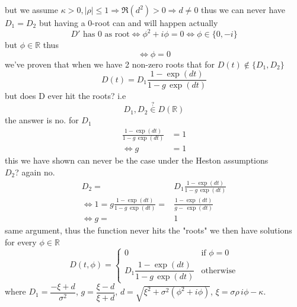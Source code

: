 but we assume  $\kappa>0,|\rho|\leq 1 \Rightarrow \Re (d^2)>0\Rightarrow d\neq 0$
thus we can never have $D_1=D_2$ but having a 0-root can and will happen actually
\begin{equation}D' \text{ has 0 as root}\Leftrightarrow \phi^2+i\phi=0\Leftrightarrow \phi\in \{0,-i\}\end{equation}
but $\phi\in \mathbb{R}$ thus
\begin{equation}\Leftrightarrow \phi=0\end{equation}
we've proven that when we have 2 non-zero roots that for  $D(t)\notin \{D_1,D_2\}$
\begin{equation}D(t)=D_1 \frac{1-\exp(dt)}{1-g\, \exp(dt)}\end{equation}
but does D ever hit the roots? i.e
\begin{equation}D_1,D_2\overset{?}{\in}D(\mathbb{R})\end{equation}
the answer is no. for $D_1$
\begin{align}
\frac{1-\exp(dt)}{1-g\, \exp(dt)}&= 1\\
\Leftrightarrow g&=1
\end{align}
this we have shown can never be the case under the Heston assumptions\\
$D_2$?
again no.
\begin{align}
D_2=&D_1 \frac{1-\exp(dt)}{1-g\, \exp(dt)}\\
\Leftrightarrow 1=g\frac{1-\exp(dt)}{1-g\, \exp(dt)}=&\frac{1-\exp(dt)}{g-\, \exp(dt)}\\
\Leftrightarrow g=&1
\end{align}
same argument, thus the function never hits the "roots"
we then have solutions for every $\phi\in\mathbb{R}$
\begin{equation}
D(t,\phi) =
\begin{cases}
0 & \text{if } \phi = 0 \\[4pt]
D_1 \dfrac{1-\exp(dt)}{1-g\,\exp(dt)} & \text{otherwise}
\end{cases}
\end{equation}
where $D_1=\dfrac{-\xi + d}{\sigma^2}$, $g=\dfrac{\xi-d}{\xi+d}$, $d=\sqrt{\xi^2+\sigma^2(\phi^2+i\phi)}$, $\xi =\sigma \rho\, i\phi -\kappa$.

